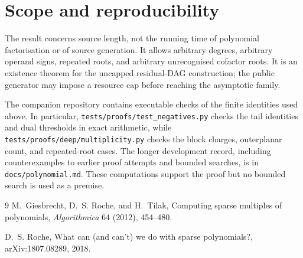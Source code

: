 \documentclass[11pt]{article}
\theoremstyle{definition}
\theoremstyle{remark}
\begin{document}
\section{Scope and reproducibility}

The result concerns source length, not the running time of polynomial
factorisation or of source generation.  It allows arbitrary degrees,
arbitrary operand signs, repeated roots, and arbitrary unrecognised cofactor
roots.  It is an existence theorem for the uncapped residual-DAG
construction; the public generator may impose a resource cap before reaching
the asymptotic family.

The companion repository contains executable checks of the finite identities
used above.  In particular,
\texttt{tests/proofs/test\_negatives.py} checks the tail identities and dual
thresholds in exact arithmetic, while
\texttt{tests/proofs/deep/multiplicity.py} checks the block charges,
outerplanar count, and repeated-root cases.  The longer development record,
including counterexamples to earlier proof attempts and bounded searches, is
in \texttt{docs/polynomial.md}.  These computations support the proof but no
bounded search is used as a premise.

\begin{thebibliography}{9}
M.~Giesbrecht, D.~S. Roche, and H.~Tilak,
\newblock Computing sparse multiples of polynomials,
\newblock \emph{Algorithmica} 64 (2012), 454--480.

D.~S. Roche,
\newblock What can (and can't) we do with sparse polynomials?,
\newblock arXiv:1807.08289, 2018.
\end{thebibliography}
\end{document}
